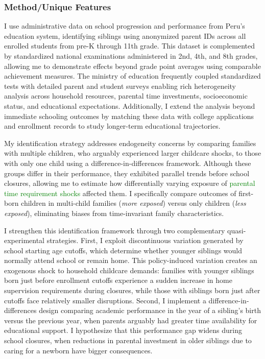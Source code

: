 
\subsubsection{Method/Unique Features}

I use administrative data on school progression and performance from Peru's education system, identifying siblings using anonymized parent IDs across all enrolled students from pre-K through 11th grade. This dataset is complemented by standardized national examinations administered in 2nd, 4th, and 8th grades, allowing me to demonstrate effects beyond grade point averages using comparable achievement measures. The ministry of education frequently coupled standardized tests with detailed parent and student surveys enabling rich heterogeneity analysis across household resources, parental time investments, socioeconomic status, and educational expectations. Additionally, I extend the analysis beyond immediate schooling outcomes by matching these data with college applications and enrollment records to study longer-term educational trajectories.

My identification strategy addresses endogeneity concerns by comparing families with multiple children, who arguably experienced larger childcare shocks, to those with only one child using a difference-in-differences framework. Although these groups differ in their performance, they exhibited parallel trends before school closures, allowing me to estimate how differentially varying exposure of \textcolor{green}{parental time requirement shocks} affected them. I specifically compare outcomes of first-born children in multi-child families (\textit{more exposed}) versus only children (\textit{less exposed}), eliminating biases from time-invariant family characteristics. 

I strengthen this identification framework through two complementary quasi-experimental strategies. First, I exploit discontinuous variation generated by school starting age cutoffs, which determine whether younger siblings would normally attend school or remain home. This policy-induced variation creates an exogenous shock to household childcare demands: families with younger siblings born just before enrollment cutoffs experience a sudden increase in home supervision requirements during closures, while those with siblings born just after cutoffs face relatively smaller disruptions. Second, I implement a difference-in-differences design comparing academic performance in the year of a sibling's birth versus the previous year, when parents arguably had greater time availability for educational support. I hypothesize that this performance gap widens during school closures, when reductions in parental investment in older siblings due to caring for a newborn have bigger consequences.


